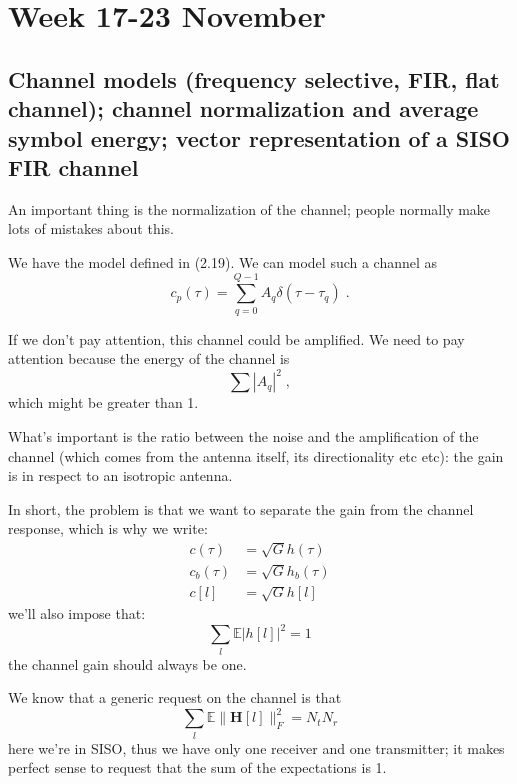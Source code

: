 \documentclass[a4paper, 12pt]{book}
\begin{document}
\setcounter{chapter}{3}
\chapter{Week 17-23 November}
\section[Channel models]{Channel models (frequency selective, FIR, flat channel); channel normalization and average symbol energy; vector representation of a SISO FIR channel}

An important thing is the normalization of the channel; people normally make lots of mistakes about this.

We have the model defined in (2.19).
We can model such a channel as
\begin{equation}
c_p(\tau) = \sum_{q=0}^{Q-1} A_q \delta(\tau - \tau_q) \;. \tag{2.19}
\end{equation}

If we don't pay attention, this channel could be amplified. We need to pay attention because the energy of the channel is
$$
\sum |A_q|^2 \;,
$$
which might be greater than 1.

\begin{tcolorbox}[sharp corners, boxrule=0pt, leftrule=2pt, colframe=green!60!black, colback=green!5, left=5pt, top=3pt, bottom=3pt]
    What's important is the ratio between the noise and the amplification of the channel (which comes from the antenna itself, its directionality etc etc): the gain is in respect to an isotropic antenna.
\end{tcolorbox}

In short, the problem is that we want to separate the gain from the channel response, which is why we write:
\begin{align}
c(\tau) &= \sqrt{G}h(\tau) \tag{2.64} \\
c_b(\tau) &= \sqrt{G}h_b(\tau) \tag{2.65} \\
c[l] &= \sqrt{G}h[l] \tag{2.66}
\end{align}
we'll also impose that:
\begin{equation}
\sum_{l} \mathbb{E}|h[l]|^2 = 1
\end{equation}
the channel gain should always be one.

\begin{remark}
We know that a generic request on the channel is that
\begin{equation*}
\sum_{l} \mathbb{E} \| \boldsymbol{H}[l] \|_F^2 = N_t N_r
\end{equation*}
here we're in SISO, thus we have only one receiver and one transmitter; it makes perfect sense to request that the sum of the expectations is 1.
\end{remark}
\end{document}
